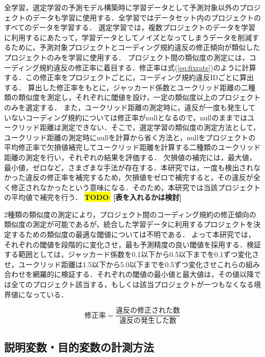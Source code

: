 \documentclass[paper]{ieicej}
\newcommand{\todo}[1]{\colorbox{yellow}{{\bf TODO}:}{\color{red} {\textbf{[#1]}}}}
\begin{document}
全学習，選定学習の予測モデル構築時に学習データとして予測対象以外のプロジェクトのデータも学習に使用する．全学習ではデータセット内のプロジェクトのすべてのデータを学習する．
選定学習では，複数プロジェクトのデータを学習に利用するにあたって，学習データとしてノイズとなってしまうデータを削減するために，予測対象プロジェクトとコーディング規約違反の修正傾向が類似したプロジェクトのみを学習に使用する．
プロジェクト間の類似度の測定には，コーディング規約違反の修正率に着目する．修正率は式(\ref{eq:fixrate})のように計算する．この修正率をプロジェクトごとに，コーディング規約違反IDごとに算出する．
算出した修正率をもとに，ジャッカード係数とユークリッド距離の二種類の類似度を測定し，それぞれに閾値を設け，一定の類似度以上のプロジェクトのみを選定する．
また，ユークリッド距離の測定時に，違反が一度も発生していないコーディング規約については修正率がnullとなるので，nullのままではユークリッド距離は測定できない．そこで，選定学習の類似度の測定方法として，ユークリッド距離の測定時にnullを計算から省く方法と，nullをプロジェクトの平均修正率で欠損値補完してユークリッド距離を計算する二種類のユークリッド距離の測定を行い，それぞれの結果を評価する．
欠損値の補完には，最大値，最小値，ゼロなど，さまざまな手法が存在する．本研究では，一度も検出されなかった違反の修正率を補完するため，欠損値をゼロで補完すると，その違反が全く修正されなかったという意味になる．そのため，本研究では当該プロジェクトの平均値で補完を行う．
\todo{表を入れるかは検討}

2種類の類似度の測定により，プロジェクト間のコーディング規約の修正傾向の類似度の測定が可能であるが，統合した学習データに利用するプロジェクトを決定するための類似度の最適な閾値については不明である．
よって本研究では，それぞれの閾値を段階的に変化させ，最も予測精度の良い閾値を採用する．検証する範囲としては，ジャッカード係数を0.1以下から0.5以下までを0.1ずつ変化させ，ユークリッド距離は1.5以下から5.0以下までを0.5ずつ変化させこれらの組み合わせを網羅的に検証する．それぞれの閾値の最小値と最大値は，その値以降では全てのプロジェクト該当する，もしくは該当プロジェクトが一つもなくなる境界値になっている．

\begin{equation}
\label{eq:fixrate}
\text{修正率} = \frac{\text{違反の修正された数}}{\text{違反の発生した数}}
\end{equation}





\subsection{説明変数・目的変数の計測方法}
\end{document}

